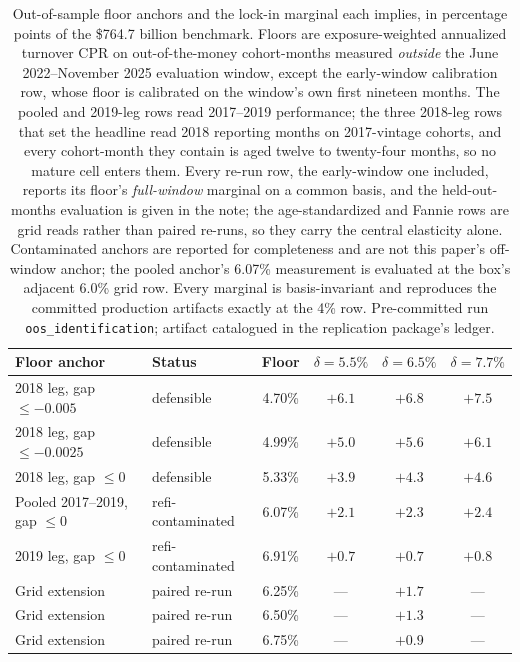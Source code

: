 \documentclass[12pt]{article}
\begin{document}
\begin{table}[!t]
\centering
\footnotesize
\begin{threeparttable}
\caption{Out-of-sample floor anchors and the lock-in marginal each implies, in percentage points of the \$764.7 billion benchmark. Floors are exposure-weighted annualized turnover CPR on out-of-the-money cohort-months measured \emph{outside} the June 2022--November 2025 evaluation window, except the early-window calibration row, whose floor is calibrated on the window's own first nineteen months. The pooled and 2019-leg rows read 2017--2019 performance; the three 2018-leg rows that set the headline read 2018 reporting months on 2017-vintage cohorts, and every cohort-month they contain is aged twelve to twenty-four months, so no mature cell enters them. Every re-run row, the early-window one included, reports its floor's \emph{full-window} marginal on a common basis, and the held-out-months evaluation is given in the note; the age-standardized and Fannie rows are grid reads rather than paired re-runs, so they carry the central elasticity alone. Contaminated anchors are reported for completeness and are not this paper's off-window anchor; the pooled anchor's 6.07\% measurement is evaluated at the box's adjacent 6.0\% grid row. Every marginal is basis-invariant and reproduces the committed production artifacts exactly at the 4\% row. Pre-committed run \texttt{oos\_identification}; artifact catalogued in the replication package's ledger.}
\label{tab:oosfloor}
\begin{tabular}{llcccc}
\toprule
Floor anchor & Status & Floor & $\delta = 5.5\%$ & $\delta = 6.5\%$ & $\delta = 7.7\%$ \\
\midrule
2018 leg, gap $\leq -0.005$ & defensible & 4.70\% & $+6.1$ & $+6.8$ & $+7.5$ \\
2018 leg, gap $\leq -0.0025$ & defensible & 4.99\% & $+5.0$ & $+5.6$ & $+6.1$ \\
2018 leg, gap $\leq 0$ & defensible & 5.33\% & $+3.9$ & $+4.3$ & $+4.6$ \\
\midrule
Pooled 2017--2019, gap $\leq 0$ & refi-contaminated & 6.07\% & $+2.1$ & $+2.3$ & $+2.4$ \\
2019 leg, gap $\leq 0$ & refi-contaminated & 6.91\% & $+0.7$ & $+0.7$ & $+0.8$ \\
\midrule
Grid extension & paired re-run\tnote{d} & 6.25\% & --- & $+1.7$ & --- \\
Grid extension & paired re-run\tnote{d} & 6.50\% & --- & $+1.3$ & --- \\
Grid extension & paired re-run\tnote{d} & 6.75\% & --- & $+0.9$ & --- \\

\end{tabular}
\end{threeparttable}
\end{table}
\end{document}
